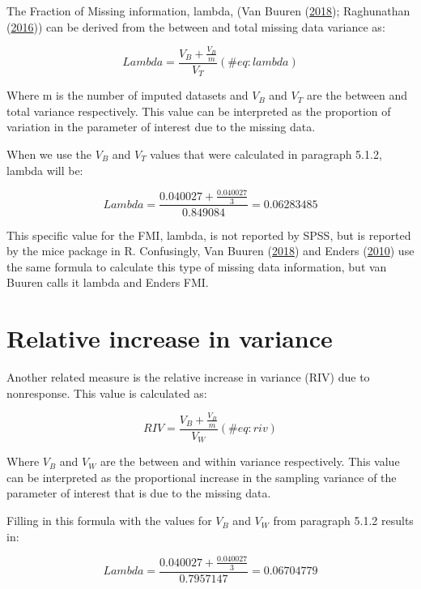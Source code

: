 \documentclass[
]{book}
\begin{document}
The Fraction of Missing information, lambda, (Van Buuren
(\protect\hyperlink{ref-VanBuuren2018}{2018}); Raghunathan
(\protect\hyperlink{ref-raghunathan2016}{2016})) can be derived from the
between and total missing data variance as:

\begin{equation}
Lambda = \frac{V_B + \frac{V_B}{m}}{V_T}
  (\#eq:lambda)
\end{equation}

Where m is the number of imputed datasets and \({V_B}\) and \({V_T}\)
are the between and total variance respectively. This value can be
interpreted as the proportion of variation in the parameter of interest
due to the missing data.

When we use the \({V_B}\) and \({V_T}\) values that were calculated in
paragraph 5.1.2, lambda will be:

\[Lambda = \frac{0.040027 + \frac{0.040027}{3}}{0.849084}=0.06283485\]

This specific value for the FMI, lambda, is not reported by SPSS, but is
reported by the mice package in R. Confusingly, Van Buuren
(\protect\hyperlink{ref-VanBuuren2018}{2018}) and Enders
(\protect\hyperlink{ref-enders2010applied}{2010}) use the same formula
to calculate this type of missing data information, but van Buuren calls
it lambda and Enders FMI.

\hypertarget{relative-increase-in-variance}{%
\section{Relative increase in
variance}\label{relative-increase-in-variance}}

Another related measure is the relative increase in variance (RIV) due
to nonresponse. This value is calculated as:

\begin{equation}
RIV = \frac{V_B + \frac{V_B}{m}}{V_W}
  (\#eq:riv)
\end{equation}

Where \({V_B}\) and \({V_W}\) are the between and within variance
respectively. This value can be interpreted as the proportional increase
in the sampling variance of the parameter of interest that is due to the
missing data.

Filling in this formula with the values for \({V_B}\) and \({V_W}\) from
paragraph 5.1.2 results in:

\[Lambda = \frac{0.040027 + \frac{0.040027}{3}}{0.7957147}=0.06704779\]
\end{document}
